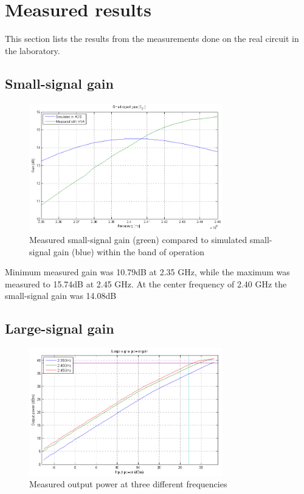   \section{Measured results}
  This section lists the results from the measurements done on the real circuit in the laboratory.

  \subsection{Small-signal gain}

  \begin{figure}[H]
	  \centering
	  \includegraphics[width=0.75\textwidth]{img/S21_meas_sim}
	  \caption{Measured small-signal gain (green) compared to simulated small-signal gain (blue) within the band of operation}
	  \label{fig:Meas_S21}
  \end{figure}

Minimum measured gain was 10.79dB at 2.35 GHz, while the maximum was measured to 15.74dB at 2.45 GHz. At the center frequency of 2.40 GHz the small-signal gain was 14.08dB

  \subsection{Large-signal gain}

  \begin{figure}[H]
	  \centering
	  \includegraphics[width=0.75\textwidth]{img/Power_Out_1tone}
	  \caption{Measured output power at three different frequencies}
	  \label{fig:Meas_Pout}
  \end{figure}


